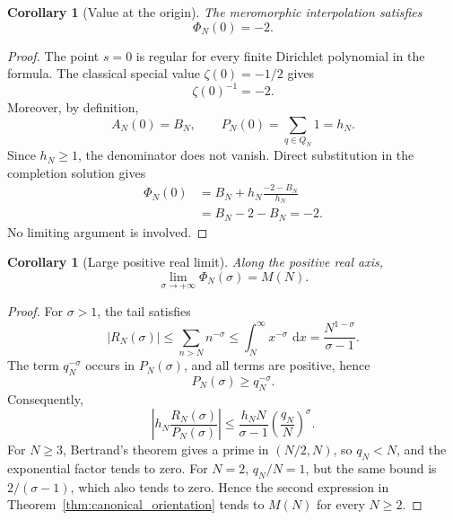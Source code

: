 \documentclass[11pt]{amsart}
\numberwithin{equation}{section}
\theoremstyle{plain}
\newtheorem{corollary}[theorem]{Corollary}
\theoremstyle{definition}
\theoremstyle{remark}
\newcommand{\1}{\mathbf{1}}
\newcommand{\dd}{\,\mathrm{d}}
\begin{document}
\begin{corollary}[Value at the origin]
\label{cor:Phi_origin}
The meromorphic interpolation satisfies
\begin{equation}
\boxed{\Phi_N(0)=-2.}
\label{eq:Phi_origin}
\end{equation}
\end{corollary}

\begin{proof}
The point \(s=0\) is regular for every finite Dirichlet polynomial in the
formula.  The classical special value \(\zeta(0)=-1/2\) gives
\begin{equation}
\zeta(0)^{-1}=-2.
\label{eq:origin_inverse_zeta}
\end{equation}
Moreover, by definition,
\begin{equation}
A_N(0)=B_N,
\qquad
P_N(0)=\sum_{q\in Q_N}1=h_N.
\label{eq:origin_finite_values}
\end{equation}
Since \(h_N\geq1\), the denominator does not vanish.  Direct substitution
in the completion solution gives
\begin{align}
\Phi_N(0)
&=
B_N+h_N\frac{-2-B_N}{h_N}
\label{eq:origin_substitution_detailed}
\\
&=
B_N-2-B_N
=-2.
\label{eq:origin_cancellation_detailed}
\end{align}
No limiting argument is involved.
\end{proof}

\begin{corollary}[Large positive real limit]
\label{cor:Phi_infinity}
Along the positive real axis,
\begin{equation}
\boxed{
\lim_{\sigma\to+\infty}\Phi_N(\sigma)=M(N).
}
\label{eq:Phi_infinity}
\end{equation}
\end{corollary}

\begin{proof}
For \(\sigma>1\), the tail satisfies
\begin{equation}
|R_N(\sigma)|
\leq
\sum_{n>N}n^{-\sigma}
\leq
\int_N^\infty x^{-\sigma}\,\dd x
=
\frac{N^{1-\sigma}}{\sigma-1}.
\label{eq:infinity_tail_bound}
\end{equation}
The term \(q_N^{-\sigma}\) occurs in \(P_N(\sigma)\), and all terms are
positive, hence
\begin{equation}
P_N(\sigma)\geq q_N^{-\sigma}.
\label{eq:infinity_denominator_bound}
\end{equation}
Consequently,
\begin{equation}
\left|h_N\frac{R_N(\sigma)}{P_N(\sigma)}\right|
\leq
\frac{h_NN}{\sigma-1}
\left(\frac{q_N}{N}\right)^\sigma.
\label{eq:infinity_ratio_bound}
\end{equation}
For \(N\geq3\), Bertrand's theorem gives a prime in \((N/2,N)\), so
\(q_N<N\), and the exponential factor tends to zero.  For \(N=2\),
\(q_N/N=1\), but the same bound is \(2/(\sigma-1)\), which also tends to
zero.  Hence the second expression in
Theorem~\ref{thm:canonical_orientation} tends to \(M(N)\) for every
\(N\geq2\).
\end{proof}
\end{document}

